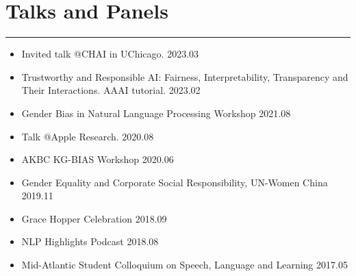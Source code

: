 \documentclass[11pt, a4paper]{article}
\newcommand{\hr}{\hrule\vspace{0.5em}}
\begin{document}
\iffalse
\vspace{0.5em}
\hspace{0.32in}\textbf{Patent}
\begin{enumerate}
	\item 1.	B. Shi, B. Li, \textbf{J. Zhao}. An Algorithm for the Migration of ARM Virtual Machines. Patent Number: 83995027CN0. (submitted)
\end{enumerate}
\fi


\section*{Talks and Panels}
\hr
\begin{itemize}
\item Invited talk @CHAI in UChicago. \hfill 2023.03
\item Trustworthy and Responsible AI: Fairness, Interpretability, Transparency and Their Interactions. AAAI tutorial. \hfill 2023.02
\item Gender Bias in Natural Language Processing Workshop \hfill 2021.08
\item Talk @Apple Research. \hfill 2020.08
\item AKBC KG-BIAS Workshop \hfill 2020.06
\item Gender Equality and Corporate Social Responsibility, UN-Women China \hfill 2019.11
\item Grace Hopper Celebration \hfill 2018.09
\item NLP Highlights Podcast \hfill 2018.08
\item Mid-Atlantic Student Colloquium on Speech, Language and Learning   \hfill 2017.05
\end{itemize}

\end{document}
